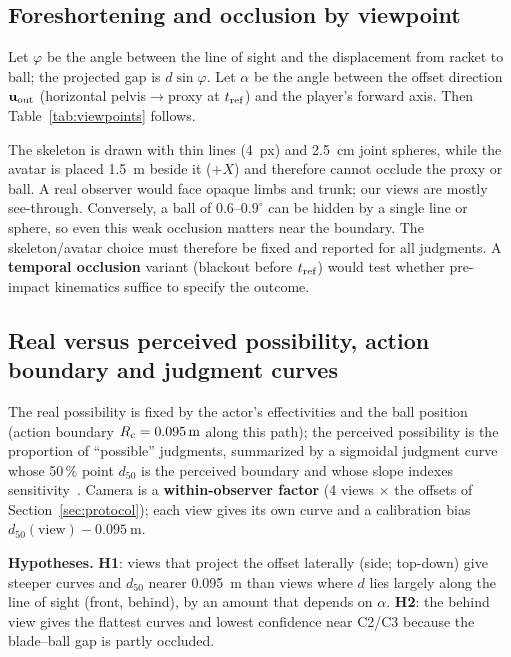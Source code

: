 \subsection{Foreshortening and occlusion by viewpoint}

Let $\varphi$ be the angle between the line of sight and the displacement from racket to ball; the projected gap is $d\sin\varphi$. Let $\alpha$ be the angle between the offset direction $\mathbf{u}_{\mathrm{out}}$ (horizontal pelvis$\to$proxy at $t_{\mathrm{ref}}$) and the player's forward axis. Then Table~\ref{tab:viewpoints} follows.



The skeleton is drawn with thin lines (4~px) and \SI{2.5}{\centi\meter} joint spheres, while the avatar is placed \SI{1.5}{\meter} beside it ($+X$) and therefore cannot occlude the proxy or ball. A real observer would face opaque limbs and trunk; our views are mostly see-through. Conversely, a ball of $0.6$--$0.9^\circ$ can be hidden by a single line or sphere, so even this weak occlusion matters near the boundary. The skeleton/avatar choice must therefore be fixed and reported for all judgments. A \textbf{temporal occlusion} variant (blackout before $t_{\mathrm{ref}}$) would test whether pre-impact kinematics suffice to specify the outcome.

\subsection{Real versus perceived possibility, action boundary and judgment curves}\label{sec:judgment-curves}

The real possibility is fixed by the actor's effectivities and the ball position (action boundary $R_{\mathrm{c}}=\SI{0.095}{\meter}$ along this path); the perceived possibility is the proportion of ``possible'' judgments, summarized by a sigmoidal judgment curve whose 50\,\% point $d_{50}$ is the perceived boundary and whose slope indexes sensitivity~\cite{warren1984,fajen2005}. Camera is a \textbf{within-observer factor} (4 views $\times$ the offsets of Section~\ref{sec:protocol}); each view gives its own curve and a calibration bias $d_{50}(\text{view})-\SI{0.095}{\meter}$.

\tagprop{} \textbf{Hypotheses.} \textbf{H1}: views that project the offset laterally (side; top-down) give steeper curves and $d_{50}$ nearer \SI{0.095}{\meter} than views where $d$ lies largely along the line of sight (front, behind), by an amount that depends on $\alpha$. \textbf{H2}: the behind view gives the flattest curves and lowest confidence near C2/C3 because the blade--ball gap is partly occluded.

